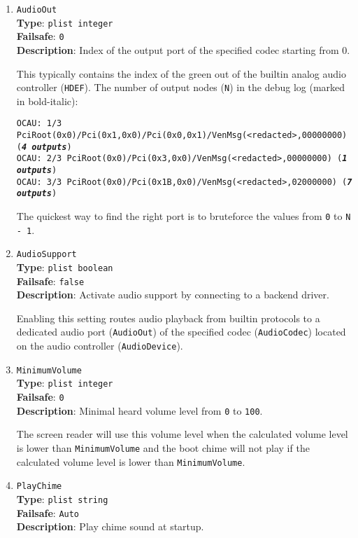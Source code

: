 \documentclass[]{article}
\begin{document}
\begin{enumerate}
\item
  \texttt{AudioOut}\\
  \textbf{Type}: \texttt{plist\ integer}\\
  \textbf{Failsafe}: \texttt{0}\\
  \textbf{Description}: Index of the output port of the specified codec starting from 0.

  This typically contains the index of the green out of the builtin analog audio controller (\texttt{HDEF}).
  The number of output nodes (\texttt{N}) in the debug log (marked in bold-italic):

  \texttt{OCAU: 1/3 PciRoot(0x0)/Pci(0x1,0x0)/Pci(0x0,0x1)/VenMsg(<redacted>,00000000) (\textit{\textbf{4 outputs}})}\\
  \texttt{OCAU: 2/3 PciRoot(0x0)/Pci(0x3,0x0)/VenMsg(<redacted>,00000000) (\textit{\textbf{1 outputs}})}\\
  \texttt{OCAU: 3/3 PciRoot(0x0)/Pci(0x1B,0x0)/VenMsg(<redacted>,02000000) (\textit{\textbf{7 outputs}})}

  The quickest way to find the right port is to bruteforce the values from \texttt{0} to \texttt{N - 1}.

\item
  \texttt{AudioSupport}\\
  \textbf{Type}: \texttt{plist\ boolean}\\
  \textbf{Failsafe}: \texttt{false}\\
  \textbf{Description}: Activate audio support by connecting to a backend driver.

  Enabling this setting routes audio playback from builtin protocols to a dedicated
  audio port (\texttt{AudioOut}) of the specified codec (\texttt{AudioCodec}) located
  on the audio controller (\texttt{AudioDevice}).

\item
  \texttt{MinimumVolume}\\
  \textbf{Type}: \texttt{plist\ integer}\\
  \textbf{Failsafe}: \texttt{0}\\
  \textbf{Description}: Minimal heard volume level from \texttt{0} to \texttt{100}.

  The screen reader will use this volume level when the calculated volume level is lower
  than \texttt{MinimumVolume} and the boot chime will not play if the calculated
  volume level is lower than \texttt{MinimumVolume}.

\item
  \texttt{PlayChime}\\
  \textbf{Type}: \texttt{plist\ string}\\
  \textbf{Failsafe}: \texttt{Auto}\\
  \textbf{Description}: Play chime sound at startup.


\end{enumerate}
\end{document}
